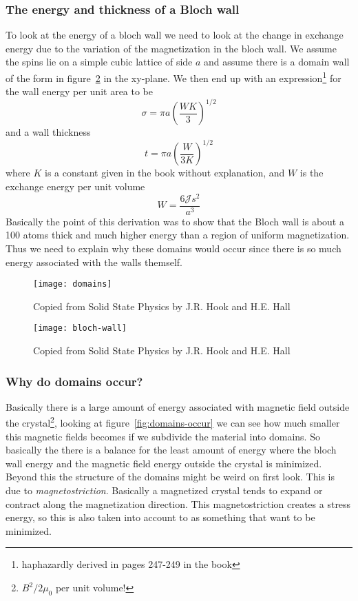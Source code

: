 \documentclass[11pt]{article}
\begin{document}
\subsubsection{The energy and thickness of a Bloch wall}
To look at the energy of a bloch wall we need to look at the change in exchange energy due to the variation of the magnetization in the bloch wall. We assume the spins lie on a simple cubic lattice of side $a$ and assume there is a domain wall of the form in figure~\ref{fig:bloch-wall} in the xy-plane. We then end up with an expression\footnote{haphazardly derived in pages 247-249 in the book} for the wall energy per unit area to be
\begin{equation}
	\sigma = \pi a (\frac{WK}{3})^{1/2}
\end{equation}
and a wall thickness 
\begin{equation}
	t = \pi a (\frac{W}{3K})^{1/2}
\end{equation}
where $K$ is a constant given in the book without explanation, and $W$ is the exchange energy per unit volume
\begin{equation}
	W = \frac{6\mathscr{J} s^2}{a^3}
\end{equation}
Basically the point of this derivation was to show that the Bloch wall is about a 100 atoms thick and much higher energy than a region of uniform magnetization. Thus we need to explain why these domains would occur since there is so much energy associated with the walls themself. 

\newpage
\begin{figure}[!h]
	\centering
	\texttt{[image: domains]}
	\caption{Copied from Solid State Physics by J.R. Hook and H.E. Hall}
	\label{fig:domains}
\end{figure}
\newpage

\begin{figure}[!h]
	\centering
	\texttt{[image: bloch-wall]}
	\caption{Copied from Solid State Physics by J.R. Hook and H.E. Hall}
	\label{fig:bloch-wall}
\end{figure}

\newpage
\subsubsection{Why do domains occur?}
Basically there is a large amount of energy associated with magnetic field outside the crystal\footnote{$B^2/2\mu_0$ per unit volume!}, looking at figure~\ref{fig:domains-occur} we can see how much smaller this magnetic fields becomes if we subdivide the material into domains. So basically the there is a balance for the least amount of energy where the bloch wall energy and the magnetic field energy outside the crystal is minimized. Beyond this the structure of the domains might be weird on first look. This is due to \emph{magnetostriction}. Basically a magnetized crystal tends to expand or contract along the magnetization direction. This magnetostriction creates a stress energy, so this is also taken into account to as something that want to be minimized.
\end{document}
